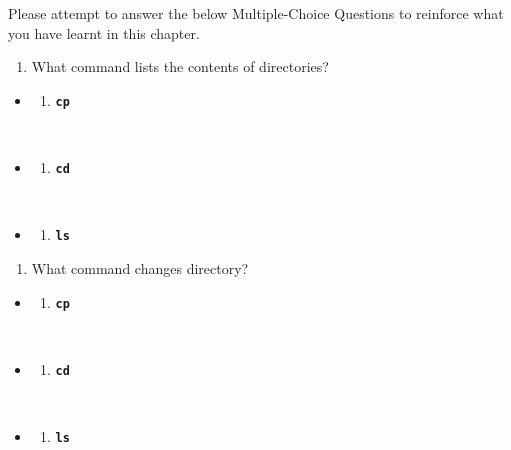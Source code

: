 \documentclass[
  letterpaper,
  DIV=11,
  numbers=noendperiod]{scrreprt}
\providecommand{\tightlist}{%
  \setlength{\itemsep}{0pt}\setlength{\parskip}{0pt}}\usepackage{longtable,booktabs,array}
\begin{document}
Please attempt to answer the below Multiple-Choice Questions to
reinforce what you have learnt in this chapter.

\begin{enumerate}
\def\labelenumi{\arabic{enumi}.}
\tightlist
\item
  What command lists the contents of directories?
\end{enumerate}

\begin{itemize}
\item
  \begin{enumerate}
  \def\labelenumi{(\Alph{enumi})}
  \tightlist
  \item
    \textbf{\texttt{cp}}\strut \\
  \end{enumerate}
\item
  \begin{enumerate}
  \def\labelenumi{(\Alph{enumi})}
  \setcounter{enumi}{1}
  \tightlist
  \item
    \textbf{\texttt{cd}}\strut \\
  \end{enumerate}
\item
  \begin{enumerate}
  \def\labelenumi{(\Alph{enumi})}
  \setcounter{enumi}{2}
  \tightlist
  \item
    \textbf{\texttt{ls}}
  \end{enumerate}
\end{itemize}

\begin{enumerate}
\def\labelenumi{\arabic{enumi}.}
\setcounter{enumi}{1}
\tightlist
\item
  What command changes directory?
\end{enumerate}

\begin{itemize}
\item
  \begin{enumerate}
  \def\labelenumi{(\Alph{enumi})}
  \tightlist
  \item
    \textbf{\texttt{cp}}\strut \\
  \end{enumerate}
\item
  \begin{enumerate}
  \def\labelenumi{(\Alph{enumi})}
  \setcounter{enumi}{1}
  \tightlist
  \item
    \textbf{\texttt{cd}}\strut \\
  \end{enumerate}
\item
  \begin{enumerate}
  \def\labelenumi{(\Alph{enumi})}
  \setcounter{enumi}{2}
  \tightlist
  \item
    \textbf{\texttt{ls}}
  \end{enumerate}
\end{itemize}
\end{document}
